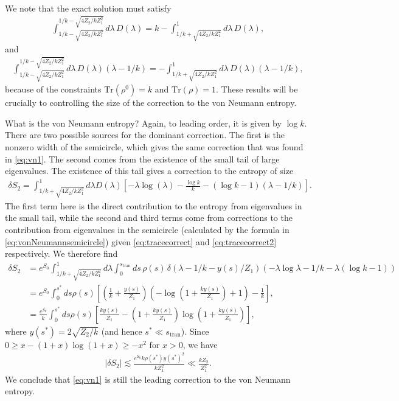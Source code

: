 \documentclass[11pt]{article}
\newcommand{\stran}{s_{\text{tran}}}
\numberwithin{equation}{section}
\def\tr{\text{Tr}}
\begin{document}
We note that the exact solution must satisfy
\begin{align} \label{eq:tracecorrect}
\int_{1/k - \sqrt{4Z_2 / k Z_1^2} }^{1/k - \sqrt{4Z_2 / k Z_1^2} } d \lambda\, D(\lambda) = k - \int_{1/k + \sqrt{4Z_2 / k Z_1^2} }^1 d \lambda\, D(\lambda),
\end{align}
and
\begin{align} \label{eq:tracecorrect2}
\int_{1/k - \sqrt{4Z_2 / k Z_1^2} }^{1/k - \sqrt{4Z_2 / k Z_1^2} } d \lambda\, D(\lambda) (\lambda - 1/k) = - \int_{1/k + \sqrt{4Z_2 / k Z_1^2} }^1 d \lambda\, D(\lambda) (\lambda - 1/k),
\end{align}
because of the constraints $\tr(\rho^0) = k$ and $\tr(\rho) = 1$. These results will be crucially to controlling the size of the correction to the von Neumann entropy.

What is the von Neumann entropy? Again, to leading order, it is given by $\log k$. There are two possible sources for the dominant correction. The first is the nonzero width of the semicircle, which gives the same correction that was found in \eqref{eq:vn1}. The second comes from the existence of the small tail of large eigenvalues. The existence of this tail gives a correction to the entropy of size
\begin{align}
\delta S_2 = \int_{1/k +\sqrt{4Z_2 / k Z_1^2}}^1 d \lambda D(\lambda) \left[-\lambda \log(\lambda) - \frac{\log k}{k} -(\log k - 1) (\lambda - 1/k)\right].
\end{align}
The first term here  is the direct contribution to the entropy from eigenvalues in the small tail, while the second and third terms come from corrections to the contribution from eigenvalues in the semicircle (calculated by the formula in \eqref{eq:vonNeumannsemicircle}) given \eqref{eq:tracecorrect} and \eqref{eq:tracecorrect2} respectively. We therefore find
\begin{align} \label{eq:thermalcorrection}
\delta S_2 &= e^{S_0}\int_{1/k +\sqrt{4Z_2 / k Z_1^2}}^1 d \lambda \int_0^{\stran} ds \,\rho(s)\, \delta( \lambda - 1/k - y(s)/ Z_1) (-\lambda\log \lambda - 1/k - \lambda (\log k - 1))
\\& = e^{S_0} \int_0^{s^*} ds \rho(s) \left[\left(\frac{1}{k} + \frac{y(s)}{Z_1}\right) \left(- \log \left(1 + \frac{k y(s)}{Z_1}\right) + 1\right) - \frac{1}{k}\right],
\\& = \frac{e^{S_0}}{k} \int_0^{s^*} ds \rho(s) \left[\frac{ky(s)}{Z_1} - \left(1 + \frac{ky(s)}{Z_1}\right) \log \left(1 + \frac{k y(s)}{Z_1}\right)\right],
\end{align}
where $y(s^*) = 2\sqrt{Z_2 / k}$ (and hence $s^* \ll \stran$). Since $0 \geq x - (1+x) \log(1 + x) \geq - x^2$ for $x > 0$, we have
\begin{align}
|\delta S_2| \lesssim \frac{e^{S_0} k \rho(s^*) y(s^*)^2}{k Z_1^2} \ll  \frac{k Z_2}{Z_1^2}.
\end{align}
We conclude that \eqref{eq:vn1} is still the leading correction to the von Neumann entropy.
\end{document}
